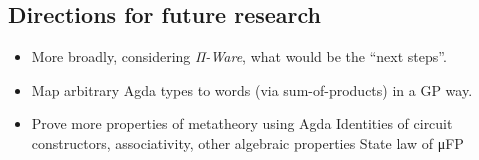             \newpage

        \subsection{Directions for future research}
        \label{subsec:future-research}
            \begin{itemize}
                \item More broadly, considering \emph{Π-Ware}, what would be the ``next steps''.
                \item Map arbitrary Agda types to words (via sum-of-products) in a GP way.
                \item Prove more properties of metatheory using Agda
                    \subitem Identities of circuit constructors, associativity, other algebraic properties
                    \subitem State law of μFP
            \end{itemize}
